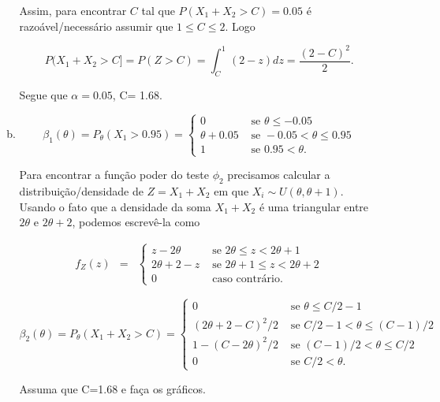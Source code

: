 \documentclass[10pt,brazil]{exam}
\begin{document}
\begin{enumerate}[1.]
\begin{enumerate}[a)]
Assim, para encontrar $C$ tal que $P(X_1+X_2 > C)=0.05$ é razoável/necessário assumir que $1\leq C\leq 2$. Logo

\[P(X_1+X_2>C]=P(Z>C)=\int_{C}^{1}(2-z)dz=\frac{(2-C)^2}{2}.\]




Segue que $\alpha=0.05$,  C= 1.68.%

\item    %

\[\beta_1(\theta)=P_\theta(X_1>0.95)=\begin{cases}
 0 & \mbox{ se } \theta\leq -0.05\\
 \theta+0.05 & \mbox{ se } -0.05< \theta\leq 0.95\\
 1 & \mbox{ se } 0.95<\theta.
\end{cases}\]

Para encontrar a função poder do teste $\phi_2$ precisamos calcular a distribuição/densidade de $Z=X_1+X_2$ em que $X_i\sim U(\theta,\theta+1)$. Usando o fato que a densidade da soma $X_1+X_2$ é uma triangular entre $2\theta$ e $2\theta+2$, podemos escrevê-la como

\begin{eqnarray*}
f_Z(z)
&=&\begin{cases}
 z-2\theta & \mbox{ se } 2\theta \leq z< 2\theta+1\\
 2\theta +2-z & \mbox{ se } 2\theta+1\leq z <2\theta+ 2\\
 0 & \mbox{ caso contrário.}
\end{cases}
\end{eqnarray*} 


 
\[\beta_2(\theta)=P_\theta(X_1+X_2>C)
=\begin{cases}
0 & \mbox{ se } \theta \leq C/2-1\\
 (2\theta +2-C)^2/2 & \mbox{ se } C/2-1 < \theta \leq (C-1)/2\\
 1-(C-2\theta)^2/2 & \mbox{ se } (C-1)/2< \theta \leq C/2\\
 0 & \mbox{ se } C/2<\theta.
\end{cases}\]

Assuma que C=1.68 e faça os gráficos.



\end{enumerate}
\end{enumerate}
\end{document}
